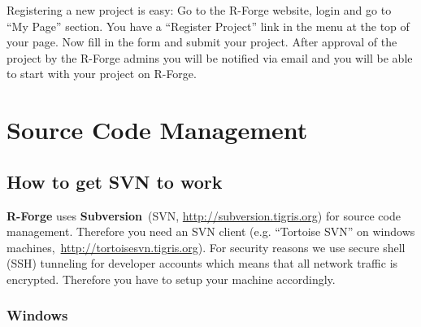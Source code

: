 \documentclass[a4paper]{report}
\begin{document}
Registering a new project is easy: Go to the R-Forge website, login and
go to ``My Page'' section. You have a ``Register Project'' link in the
menu at the top of your page. Now fill in the form and submit your
project. After approval of the project by the R-Forge admins  you will
be notified via email and you will be able to start with your project
on R-Forge.

\section{Source Code Management}
\label{sec:scm}

\subsection{How to get SVN to work}
\label{sec:scmhowto}

\textbf{R-Forge} uses
\textbf{Subversion}~(SVN, \url{http://subversion.tigris.org}) for
source code management.
Therefore you need an SVN client (e.g. ``Tortoise SVN'' on
windows machines,~\url{http://tortoisesvn.tigris.org}). For security
reasons we use secure shell (SSH) tunneling for
developer accounts which means that all network traffic is
encrypted. Therefore you have to setup your machine accordingly.

\subsubsection{Windows}
\end{document}
